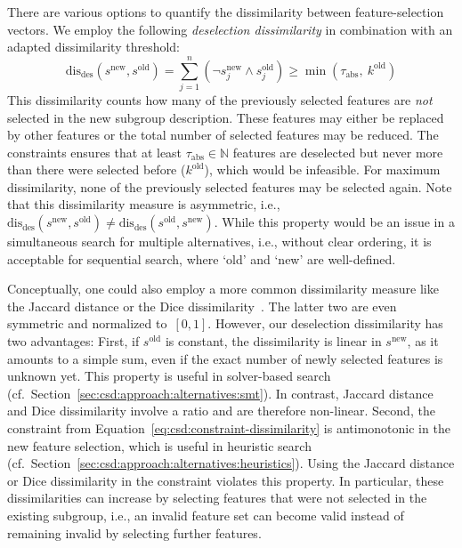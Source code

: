 \documentclass{article}
\theoremstyle{definition}
\begin{document}
There are various options to quantify the dissimilarity between feature-selection vectors.
We employ the following \emph{deselection dissimilarity} in combination with an adapted dissimilarity threshold:
%
\begin{equation}
	\text{dis}_{\text{des}}(s^{\text{new}}, s^{\text{old}}) = \sum_{j=1}^n (\lnot s^{\text{new}}_j \land s^{\text{old}}_j) \geq \min \left( \tau_{\text{abs}},~k^{\text{old}} \right)
	\label{eq:csd:constraint-dissimilarity}
\end{equation}
%
This dissimilarity counts how many of the previously selected features are \emph{not} selected in the new subgroup description.
These features may either be replaced by other features or the total number of selected features may be reduced.
The constraints ensures that at least $\tau_{\text{abs}} \in \mathbb{N}$ features are deselected but never more than there were selected before ($k^{\text{old}}$), which would be infeasible.
For maximum dissimilarity, none of the previously selected features may be selected again.
Note that this dissimilarity measure is asymmetric, i.e., $\text{dis}_{\text{des}}(s^{\text{new}}, s^{\text{old}}) \neq \text{dis}_{\text{des}}(s^{\text{old}}, s^{\text{new}})$.
While this property would be an issue in a simultaneous search for multiple alternatives, i.e., without clear ordering, it is acceptable for sequential search, where `old' and `new' are well-defined.

Conceptually, one could also employ a more common dissimilarity measure like the Jaccard distance or the Dice dissimilarity~\cite{choi2010survey}.
The latter two are even symmetric and normalized to~$[0,1]$.
However, our deselection dissimilarity has two advantages:
First, if $s^{\text{old}}$ is constant, the dissimilarity is linear in $s^{\text{new}}$, as it amounts to a simple sum, even if the exact number of newly selected features is unknown yet.
This property is useful in solver-based search (cf.~Section~\ref{sec:csd:approach:alternatives:smt}).
In contrast, Jaccard distance and Dice dissimilarity involve a ratio and are therefore non-linear.
Second, the constraint from Equation~\ref{eq:csd:constraint-dissimilarity} is antimonotonic in the new feature selection, which is useful in heuristic search (cf.~Section~\ref{sec:csd:approach:alternatives:heuristics}).
Using the Jaccard distance or Dice dissimilarity in the constraint violates this property.
In particular, these dissimilarities can increase by selecting features that were not selected in the existing subgroup, i.e., an invalid feature set can become valid instead of remaining invalid by selecting further features.
\end{document}
